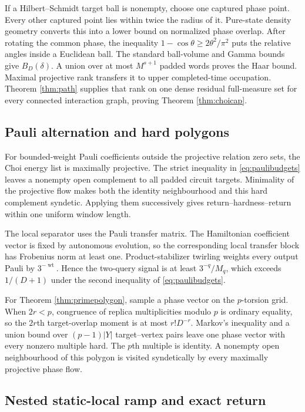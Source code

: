 If a Hilbert--Schmidt target ball is nonempty, choose one captured phase
point.  Every other captured point lies within twice the radius of it.
Pure-state density geometry converts this into a lower bound on normalized
phase overlap.  After rotating the common phase, the inequality
$1-\cos\theta\ge2\theta^2/\pi^2$ puts the relative angles inside a Euclidean
ball.  The standard ball-volume and Gamma bounds give $B_D(\delta)$.  A union
over at most $M^{s+1}$ padded words proves the Haar bound.  Maximal projective
rank transfers it to upper completed-time occupation.  Theorem
\ref{thm:path} supplies that rank on one dense residual full-measure set for
every connected interaction graph, proving Theorem \ref{thm:choicap}.

\subsection{Pauli alternation and hard polygons}

For bounded-weight Pauli coefficients outside the projective relation zero
sets, the Choi energy list is maximally projective.  The strict inequality
in \eqref{eq:paulibudgets} leaves a nonempty open complement to all padded
circuit targets.  Minimality of the projective flow makes both the identity
neighbourhood and this hard complement syndetic.  Applying them successively
gives return--hardness--return within one uniform window length.

The local separator uses the Pauli transfer matrix.  The Hamiltonian
coefficient vector is fixed by autonomous evolution, so the corresponding
local transfer block has Frobenius norm at least one.  Product-stabilizer
twirling weights every output Pauli by $3^{-\operatorname{wt}}$.  Hence the
two-query signal is at least $3^{-q}/M_q$, which exceeds $1/(D+1)$ under the
second inequality of \eqref{eq:paulibudgets}.

For Theorem \ref{thm:primepolygon}, sample a phase vector on the $p$-torsion
grid.  When $2r<p$, congruence of replica multiplicities modulo $p$ is
ordinary equality, so the $2r$th target-overlap moment is at most
$r!D^{-r}$.  Markov's inequality and a union bound over
$(p-1)|Y|$ target--vertex pairs leave one phase vector with every nonzero
multiple hard.  The $p$th multiple is identity.  A nonempty open
neighbourhood of this polygon is visited syndetically by every maximally
projective phase flow.

\subsection{Nested static-local ramp and exact return}

